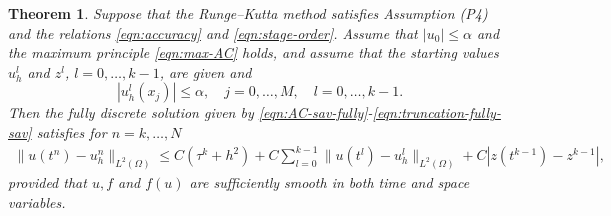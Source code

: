\documentclass[a4paper, oneside]{book}
\def\II{(\Omega)}
\newtheorem{theorem}{Theorem}[section]
\begin{document}

\begin{theorem}\label{thm:sav-error}
Suppose that the Runge--Kutta method satisfies Assumption (P4) and the relations \eqref{eqn:accuracy} and \eqref{eqn:stage-order}.
Assume that $|u_0| \le \alpha$ and the maximum principle \eqref{eqn:max-AC} holds,
and assume that the starting values $u_h^l$ and $z^l$, $l=0,\dots,k-1$, are given and
$$
|u_h^l(x_j)|\le \alpha , \quad j=0,\dots,M,\quad l=0,\dots,k-1.
$$
Then the   {fully discrete} solution given by \eqref{eqn:AC-sav-fully}-\eqref{eqn:truncation-fully-sav} satisfies
{for $n=k,\ldots,N$}
\begin{align}\label{fully-err-AC}
  \| u(t^n) - u_h^n \|_{L^2(\Omega)} \le  C(\tau^k + h^{2}) + C\sum_{l=0}^{k-1}
  \| u(t^l) - u_h^l \|_{L^2(\Omega)} + C|z(t^{k-1}) - z^{k-1}| ,
\end{align}
provided that $u, f$ and $f(u)$ are sufficiently smooth in both time and space variables.
\end{theorem}
\end{document}
